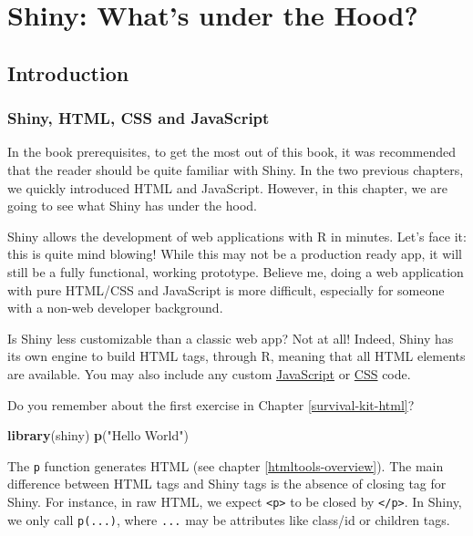 \documentclass[
]{book}
\newenvironment{Shaded}{\begin{snugshade}}{\end{snugshade}}
\newcommand{\KeywordTok}[1]{\textcolor[rgb]{0.13,0.29,0.53}{\textbf{#1}}}
\newcommand{\NormalTok}[1]{#1}
\newcommand{\StringTok}[1]{\textcolor[rgb]{0.31,0.60,0.02}{#1}}
\begin{document}
\hypertarget{part-shiny-whats-under-the-hood}{%
\part*{Shiny: What's under the Hood?}\label{part-shiny-whats-under-the-hood}}

\hypertarget{shiny-intro}{%
\chapter{Introduction}\label{shiny-intro}}

\hypertarget{shiny-html-css-and-javascript}{%
\section{Shiny, HTML, CSS and JavaScript}\label{shiny-html-css-and-javascript}}

In the book prerequisites, to get the most out of this book, it was recommended that the reader should be quite familiar with Shiny. In the two previous chapters, we quickly introduced HTML and JavaScript. However, in this chapter, we are going to see what Shiny has under the hood.

Shiny allows the development of web applications with R in minutes. Let's face it: this is quite mind blowing! While this may not be a production ready app, it will still be a fully functional, working prototype. Believe me, doing a web application with pure HTML/CSS and JavaScript is more difficult, especially for someone with a non-web developer background.

Is Shiny less customizable than a classic web app? Not at all! Indeed, Shiny has its own engine to build HTML tags, through R, meaning that all HTML elements are available. You may also include any custom \href{https://shiny.rstudio.com/articles/packaging-javascript.html}{JavaScript} or \href{https://mastering-shiny.org/advanced-ui.html}{CSS} code.

Do you remember about the first exercise in Chapter \ref{survival-kit-html}?

\begin{Shaded}
\begin{Highlighting}[]
\KeywordTok{library}\NormalTok{(shiny)}
\KeywordTok{p}\NormalTok{(}\StringTok{"Hello World"}\NormalTok{)}
\end{Highlighting}
\end{Shaded}

The \texttt{p} function generates HTML (see chapter \ref{htmltools-overview}). The main difference between HTML tags and Shiny tags is the absence of closing tag for Shiny. For instance, in raw HTML, we expect \texttt{\textless{}p\textgreater{}} to be closed by \texttt{\textless{}/p\textgreater{}}. In Shiny, we only call \texttt{p(...)}, where \texttt{...} may be attributes like class/id or children tags.
\end{document}
